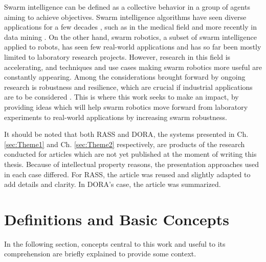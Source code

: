 \label{sec:Introduction}  %
Swarm intelligence can be defined as a collective behavior in a group of agents aiming to achieve objectives. Swarm intelligence algorithms have seen diverse applications for a few decades \cite{lones2014metaheuristics}, such as in the medical field \cite{lewis1992behavioral, al2012identifying} and more recently in data mining \cite{martens2011editorial}. On the other hand, swarm robotics, a subset of swarm intelligence applied to robots, has seen few real-world applications and has so far been mostly limited to laboratory research projects. However, research in this field is accelerating, and techniques and use cases making swarm robotics more useful are constantly appearing. Among the considerations brought forward by ongoing research is robustness and resilience, which are crucial if industrial applications are to be considered \cite{prorok2021beyond,dorigo2021swarm}. This is where this work seeks to make an impact, by providing ideas which will help swarm robotics move forward from laboratory experiments to real-world applications by increasing swarm robustness.

It should be noted that both \ac{RASS} and \ac{DORA}, the systems presented in Ch. \ref{sec:Theme1} and Ch. \ref{sec:Theme2} respectively, are products of the research conducted for articles which are not yet published at the moment of writing this thesis. Because of intellectual property reasons, the presentation approaches used in each case differed. For \ac{RASS}, the article was reused and slightly adapted to add details and clarity. In \ac{DORA}'s case, the article was summarized.


\section{Definitions and Basic Concepts}  %
In the following section, concepts central to this work and useful to its comprehension are briefly explained to provide some context.

